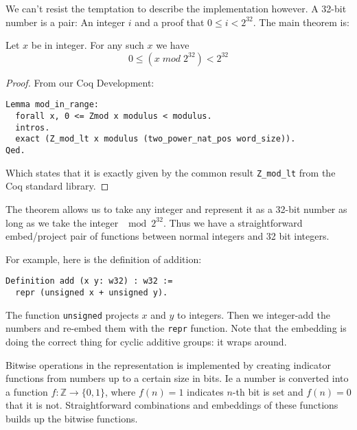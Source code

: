 We can't resist the temptation to describe the implementation however. A
32-bit number is a pair: An integer $i$ and a proof that $0 \leq i <
2^{32}$. The main theorem is:
\begin{lem}
  Let $x$ be in integer. For any such $x$ we have
  \begin{equation*}
    0 \leq (x \;mod\; 2^{32}) < 2^{32}
  \end{equation*}
\end{lem}
\begin{proof}
  From our Coq Development:
\begin{verbatim}
Lemma mod_in_range:
  forall x, 0 <= Zmod x modulus < modulus.
  intros.
  exact (Z_mod_lt x modulus (two_power_nat_pos word_size)).
Qed.
\end{verbatim}
  Which states that it is exactly given by the common result
  \texttt{Z\_mod\_lt} from the Coq standard library.
\end{proof}
The theorem allows us to take any integer and represent it as a 32-bit
number as long as we take the integer $\mod 2^{32}$. Thus we have a
straightforward embed/project pair of functions between normal
integers and 32 bit integers.

For example, here is the definition of addition:
\begin{verbatim}
Definition add (x y: w32) : w32 :=
  repr (unsigned x + unsigned y).
\end{verbatim}
The function \texttt{unsigned} projects $x$ and $y$ to integers. Then
we integer-add the numbers and re-embed them with the \texttt{repr}
function. Note that the embedding is doing the correct thing for
cyclic additive groups: it wraps around.

Bitwise operations in the representation is implemented by creating
indicator functions from numbers up to a certain size in bits. Ie a
number is converted into a function $f \colon \mathbb{Z} \to \{0,
1\}$, where $f(n) = 1$ indicates $n$-th bit is set and $f(n) = 0$
that it is not. Straightforward combinations and embeddings of these
functions builds up the bitwise functions.

